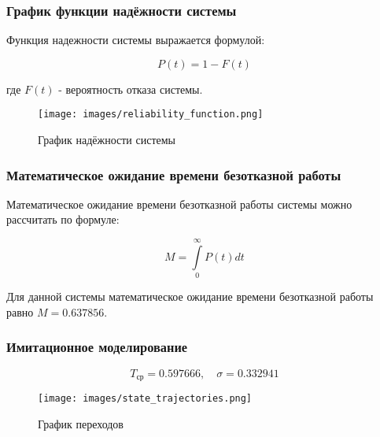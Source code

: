 \subsubsection{График функции надёжности системы}

Функция надежности системы выражается формулой:

$$
P(t) = 1 - F(t)
$$

где $F(t)$ - вероятность отказа системы.

\begin{figure}[H] %
    \centering %
    \texttt{[image: images/reliability\_function.png]} %
    \caption{График надёжности системы} %
    \label{img:reliability_function.png} %
\end{figure}


\subsubsection{Математическое ожидание времени безотказной работы}

Математическое ожидание времени безотказной работы системы можно рассчитать по формуле:

$$
M=\int\limits_{0}^{\infty}P(t)dt
$$

Для данной системы математическое ожидание времени безотказной работы равно $M = 0.637856$.

\subsubsection{Имитационное моделирование}

$$
T_{\text{ср}} = 0.597666, \quad \sigma = 0.332941
$$

\begin{figure}[H] %
    \centering %
    \texttt{[image: images/state\_trajectories.png]} %
    \caption{График переходов} %
    \label{img:state_trajectories.png} %
\end{figure}

\newpage
